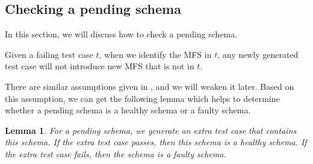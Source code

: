 \documentclass{sig-alternate-05-2015}
\begin{document}
{{%



\subsection{Checking a pending schema}
In this section, we will discuss how to check a pending schema.

\begin{assumption}
Given a failing test case $t$, when we identify the MFS in $t$, any newly generated test case will not introduce new MFS that is not in $t$.
\end{assumption}

There are similar assumptions given in \cite{zhang2011characterizing,martinez2008algorithms,martinez2009locating}, and we will weaken it later. Based on this assumption, we can get the following lemma which helps to determine whether a pending schema is a healthy schema or a faulty schema.
\newtheorem{lemma}{Lemma}
\begin{lemma}
For a pending schema, we generate an extra test case that contains this schema. If the extra test case passes, then this schema is a healthy schema. If the extra test case fails, then the schema is a faulty schema.
\end{lemma}
%
}}
\end{document}
